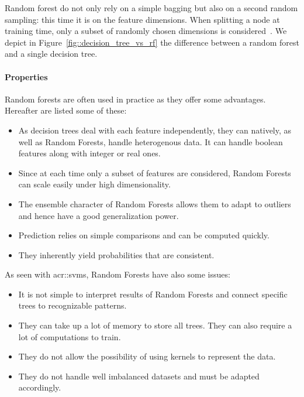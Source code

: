                 Random forest do not only rely on a simple bagging but also on a second random sampling: this time it is on the feature dimensions.
                When splitting a node at training time, only a subset of randomly chosen dimensions is considered~\parencite{breiman2001random}.
                We depict in Figure~\ref{fig::decision_tree_vs_rf} the difference between a random forest and a single decision tree.

            \paragraph{Properties}
                Random forests are often used in practice as they offer some advantages.
                Hereafter are listed some of these:
                \begin{itemize}
                    \item As decision trees deal with each feature independently, they can natively, as well as Random Forests, handle heterogenous data.
                        It can handle boolean features along with integer or real ones.
                    \item Since at each time only a subset of features are considered, Random Forests can scale easily under high dimensionality.
                    \item The ensemble character of Random Forests allows them to adapt to outliers and hence have a good generalization power.
                    \item Prediction relies on simple comparisons and can be computed quickly.
                    \item They inherently yield probabilities that are consistent.
                \end{itemize}
                As seen with \glspl{acr::svm}, Random Forests have also some issues:
                \begin{itemize}
                    \item It is not simple to interpret results of Random Forests and connect specific trees to recognizable patterns.
                    \item They can take up a lot of memory to store all trees.
                            They can also require a lot of computations to train.
                    \item They do not allow the possibility of using kernels to represent the data.
                    \item They do not handle well imbalanced datasets and must be adapted accordingly.
                \end{itemize}
                
